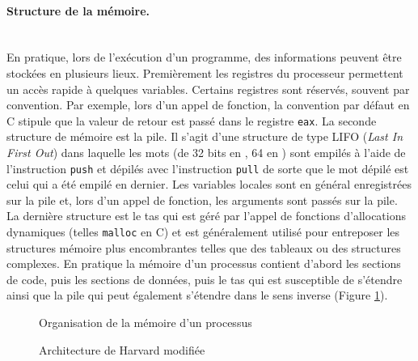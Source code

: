 \paragraph{Structure de la mémoire.}~\\
En pratique, lors de l'exécution d'un programme, des informations peuvent être stockées en plusieurs lieux. 
Premièrement les registres du processeur permettent un accès rapide à quelques variables.
Certains registres sont réservés, souvent par convention. Par exemple, lors d'un appel de fonction, la convention par défaut en C  stipule que la valeur de retour est passé dans le registre \texttt{eax}.
La seconde structure de mémoire est la pile. 
Il s'agit d'une structure de type LIFO (\emph{Last In First Out}) dans laquelle les mots (de 32 bits en \xq, 64 en \xs) sont empilés à l'aide de l'instruction \texttt{push} et dépilés avec l'instruction \texttt{pull} de sorte que le mot dépilé est celui qui a été empilé en dernier.
Les variables locales sont en général enregistrées sur la pile et, lors d'un appel de fonction, les arguments sont passés sur la pile.
La dernière structure est le tas qui est géré par l'appel de fonctions d'allocations dynamiques (telles \texttt{malloc} en C) et est généralement utilisé pour entreposer les structures mémoire plus encombrantes telles que des tableaux ou des structures complexes.
En pratique la mémoire d'un processus contient d'abord les sections de code, puis les sections de données, puis le tas qui est susceptible de s'étendre ainsi que la pile qui peut également s'étendre dans le sens inverse (Figure \ref{fig:mem_process}).

\begin{figure}
\begin{center}
% 
\missingfigure{!}
\caption{Organisation de la mémoire d'un processus}
\label{fig:mem_process}
\end{center}
\end{figure}

\begin{figure}
\begin{center}

\caption{Architecture de Harvard modifiée}
\label{fig:arch_harvard_mod}
\end{center}
\end{figure}

